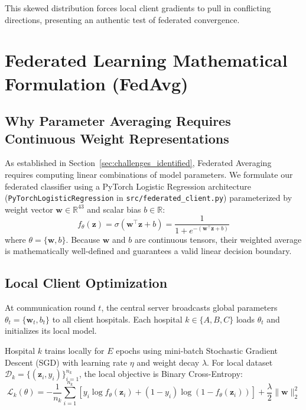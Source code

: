 This skewed distribution forces local client gradients to pull in conflicting directions, presenting an authentic test of federated convergence.

\section{Federated Learning Mathematical Formulation (FedAvg)}
\label{sec:fedavg_formulation}

\subsection{Why Parameter Averaging Requires Continuous Weight Representations}
\label{subsec:why_continuous_weights}

As established in Section~\ref{sec:challenges_identified}, Federated Averaging requires computing linear combinations of model parameters. We formulate our federated classifier using a PyTorch Logistic Regression architecture (\texttt{PyTorchLogisticRegression} in \texttt{src/federated\_client.py}) parameterized by weight vector $\mathbf{w} \in \mathbb{R}^{43}$ and scalar bias $b \in \mathbb{R}$:
\begin{equation}
f_{\theta}(\mathbf{z}) = \sigma(\mathbf{w}^\top \mathbf{z} + b) = \frac{1}{1 + e^{-(\mathbf{w}^\top \mathbf{z} + b)}}
\end{equation}
where $\theta = \{\mathbf{w}, b\}$. Because $\mathbf{w}$ and $b$ are continuous tensors, their weighted average is mathematically well-defined and guarantees a valid linear decision boundary.

\subsection{Local Client Optimization}
\label{subsec:local_optimization}

At communication round $t$, the central server broadcasts global parameters $\theta_t = \{\mathbf{w}_t, b_t\}$ to all client hospitals. Each hospital $k \in \{A, B, C\}$ loads $\theta_t$ and initializes its local model.

Hospital $k$ trains locally for $E$ epochs using mini-batch Stochastic Gradient Descent (SGD) with learning rate $\eta$ and weight decay $\lambda$. For local dataset $\mathcal{D}_k = \{(\mathbf{z}_{i}, y_{i})\}_{i=1}^{n_k}$, the local objective is Binary Cross-Entropy:
\begin{equation}
\label{eq:local_loss}
\mathcal{L}_k(\theta) = -\frac{1}{n_k} \sum_{i=1}^{n_k} \left[ y_i \log f_{\theta}(\mathbf{z}_i) + (1 - y_i) \log(1 - f_{\theta}(\mathbf{z}_i)) \right] + \frac{\lambda}{2} \|\mathbf{w}\|_2^2
\end{equation}

